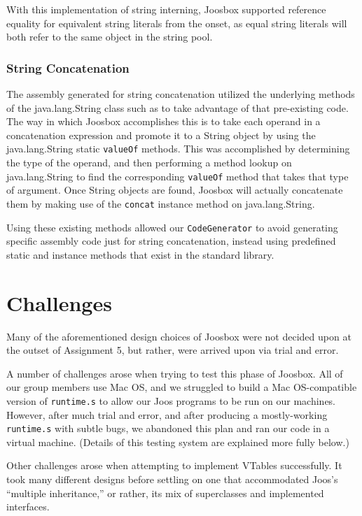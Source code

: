 \documentclass[letterpaper]{article}
\begin{document}
  With this implementation of string interning, Joosbox supported reference
  equality for equivalent string literals from the onset, as equal string literals
  will both refer to the same object in the string pool.

  \subsubsection{String Concatenation}

  The assembly generated for string concatenation utilized the underlying
  methods of the java.lang.String class such as to take advantage of that
  pre-existing code. The way in which Joosbox accomplishes this is to take each
  operand in a concatenation expression and promote it to a String object by
  using the java.lang.String static {\tt valueOf} methods. This was accomplished
  by determining the type of the operand, and then performing a method lookup on
  java.lang.String to find the corresponding {\tt valueOf} method that takes
  that type of argument. Once String objects are found, Joosbox will actually
  concatenate them by making use of the {\tt concat} instance
  method on java.lang.String.

  Using these existing methods allowed our {\tt CodeGenerator} to avoid
  generating specific assembly code just for string concatenation, instead
  using predefined static and instance methods that exist in the standard
  library.

  \section{Challenges}

  Many of the aforementioned design choices of Joosbox were not decided upon
  at the outset of Assignment 5, but rather, were arrived upon via trial and
  error.

  A number of challenges arose when trying to test this phase of Joosbox. All
  of our group members use Mac OS, and we struggled to build a Mac OS-compatible
  version of {\tt runtime.s} to allow our Joos programs to be run
  on our machines. However, after much trial and error, and after producing a
  mostly-working {\tt runtime.s} with subtle bugs, we abandoned this plan and
  ran our code in a virtual machine. (Details of this testing system are
  explained more fully below.)

  Other challenges arose when attempting to implement VTables successfully. It
  took many different designs before settling on one that accommodated  Joos's
  ``multiple inheritance,'' or rather, its mix of superclasses and implemented
  interfaces.
\end{document}
